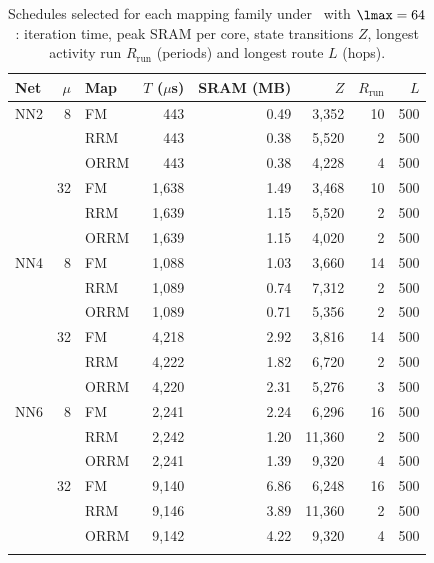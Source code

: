 \begin{table}[t]
\centering
\caption{Schedules selected for each mapping family under \Rc\ with $\lmax=64$: iteration time, peak SRAM per core, state transitions $Z$, longest activity run $R_{\mathrm{run}}$ (periods) and longest route $L$ (hops).}
\label{tab:mapping}
\small
\setlength{\tabcolsep}{2.5pt}
\begin{tabular}{@{}lrlrrrrr@{}}
\toprule
Net & $\mu$ & Map & $T$ ($\mu$s) & SRAM (MB) & $Z$ & $R_{\mathrm{run}}$ & $L$\\
\midrule
NN2 & 8 & FM & 443 & 0.49 & 3{,}352 & 10 & 500\\
 &  & RRM & 443 & 0.38 & 5{,}520 & 2 & 500\\
 &  & ORRM & 443 & 0.38 & 4{,}228 & 4 & 500\\
\addlinespace[1pt]
 & 32 & FM & 1{,}638 & 1.49 & 3{,}468 & 10 & 500\\
 &  & RRM & 1{,}639 & 1.15 & 5{,}520 & 2 & 500\\
 &  & ORRM & 1{,}639 & 1.15 & 4{,}020 & 2 & 500\\
\addlinespace[1pt]
NN4 & 8 & FM & 1{,}088 & 1.03 & 3{,}660 & 14 & 500\\
 &  & RRM & 1{,}089 & 0.74 & 7{,}312 & 2 & 500\\
 &  & ORRM & 1{,}089 & 0.71 & 5{,}356 & 2 & 500\\
\addlinespace[1pt]
 & 32 & FM & 4{,}218 & 2.92 & 3{,}816 & 14 & 500\\
 &  & RRM & 4{,}222 & 1.82 & 6{,}720 & 2 & 500\\
 &  & ORRM & 4{,}220 & 2.31 & 5{,}276 & 3 & 500\\
\addlinespace[1pt]
NN6 & 8 & FM & 2{,}241 & 2.24 & 6{,}296 & 16 & 500\\
 &  & RRM & 2{,}242 & 1.20 & 11{,}360 & 2 & 500\\
 &  & ORRM & 2{,}241 & 1.39 & 9{,}320 & 4 & 500\\
\addlinespace[1pt]
 & 32 & FM & 9{,}140 & 6.86 & 6{,}248 & 16 & 500\\
 &  & RRM & 9{,}146 & 3.89 & 11{,}360 & 2 & 500\\
 &  & ORRM & 9{,}142 & 4.22 & 9{,}320 & 4 & 500\\
\addlinespace[1pt]
\bottomrule
\end{tabular}
\end{table}